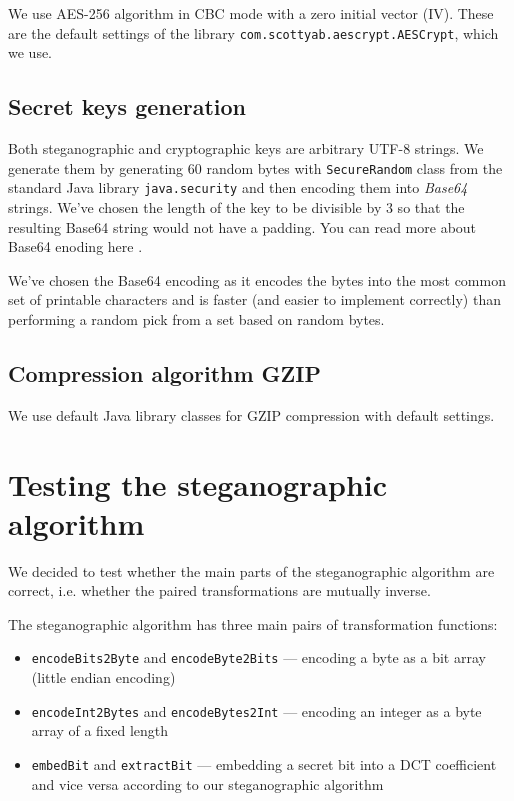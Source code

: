 We use AES-256 algorithm in CBC mode with a zero initial vector (IV). These are the default
settings of the library \texttt{com.scottyab.aescrypt.AESCrypt}, which we use.

\subsection{Secret keys generation}
Both steganographic and cryptographic keys are arbitrary UTF-8 strings. We generate 
them by generating 60 random bytes with \texttt{SecureRandom} class from the standard
Java library \texttt{java.security} and then encoding them into \emph{Base64} strings.
We've chosen the length of the key to be divisible by $3$ so that the resulting
Base64 string would not have a padding. 
You can read more about Base64 enoding here \cite{josefsson2006base16}.

We've chosen the Base64 encoding as it encodes the bytes into the most common set
of printable characters and is faster (and easier to implement correctly) 
than performing a random pick from a set based on random bytes.

\subsection{Compression algorithm GZIP}

We use default Java library classes for GZIP compression with default settings.

\section{Testing the steganographic algorithm}

We decided to test whether the main parts of the steganographic algorithm
are correct, i.e. whether the paired transformations are mutually inverse.

The steganographic algorithm has three main pairs of transformation functions:
\begin{itemize}
    \item \texttt{encodeBits2Byte} and \texttt{encodeByte2Bits} 
        --- encoding a byte as a bit array (little endian encoding)
    \item \texttt{encodeInt2Bytes} and \texttt{encodeBytes2Int}
        --- encoding an integer as a byte array of a fixed length
    \item \texttt{embedBit} and \texttt{extractBit} 
        --- embedding a secret bit into a DCT coefficient and vice versa
        according to our steganographic algorithm
\end{itemize}

